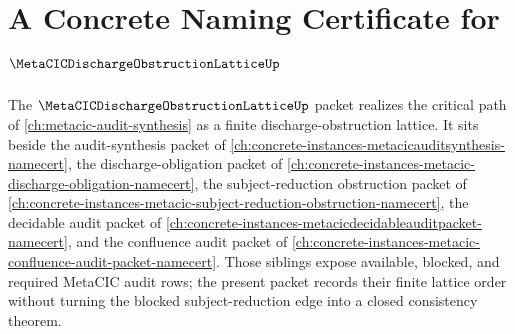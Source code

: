 \chapter{A Concrete Naming Certificate for $\MetaCICDischargeObstructionLatticeUp$}
\label{ch:concrete-instances-metacicdischargeobstructionlattice-namecert}

The $\MetaCICDischargeObstructionLatticeUp$ packet realizes the critical path of \autoref{ch:metacic-audit-synthesis} as a finite discharge-obstruction lattice. It sits beside the audit-synthesis packet of \autoref{ch:concrete-instances-metacicauditsynthesis-namecert}, the discharge-obligation packet of \autoref{ch:concrete-instances-metacic-discharge-obligation-namecert}, the subject-reduction obstruction packet of \autoref{ch:concrete-instances-metacic-subject-reduction-obstruction-namecert}, the decidable audit packet of \autoref{ch:concrete-instances-metacicdecidableauditpacket-namecert}, and the confluence audit packet of \autoref{ch:concrete-instances-metacic-confluence-audit-packet-namecert}. Those siblings expose available, blocked, and required MetaCIC audit rows; the present packet records their finite lattice order without turning the blocked subject-reduction edge into a closed consistency theorem.

